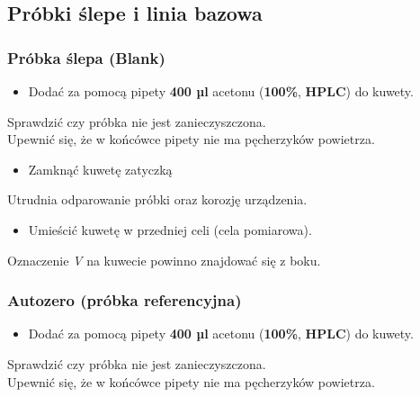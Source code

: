 \documentclass[
  letterpaper,
  DIV=11,
  numbers=noendperiod]{scrreprt}
\providecommand{\tightlist}{%
  \setlength{\itemsep}{0pt}\setlength{\parskip}{0pt}}\usepackage{longtable,booktabs,array}
\begin{document}
\hypertarget{pruxf3bki-ux15blepe-i-linia-bazowa}{%
\subsection{Próbki ślepe i linia
bazowa}\label{pruxf3bki-ux15blepe-i-linia-bazowa}}

\hypertarget{pruxf3bka-ux15blepa-blank}{%
\subsubsection{Próbka ślepa (Blank)}\label{pruxf3bka-ux15blepa-blank}}

\begin{itemize}
\tightlist
\item
  Dodać za pomocą pipety \textbf{400 µl} acetonu (\textbf{100\%},
  \textbf{HPLC}) do kuwety.
\end{itemize}

Sprawdzić czy próbka nie jest zanieczyszczona.\\
Upewnić się, że w końcówce pipety nie ma pęcherzyków powietrza.

\begin{itemize}
\tightlist
\item
  Zamknąć kuwetę zatyczką
\end{itemize}

Utrudnia odparowanie próbki oraz korozję urządzenia.

\begin{itemize}
\tightlist
\item
  Umieścić kuwetę w przedniej celi (cela pomiarowa).
\end{itemize}

Oznaczenie \emph{V} na kuwecie powinno znajdować się z boku.

\hypertarget{autozero-pruxf3bka-referencyjna}{%
\subsubsection{Autozero (próbka
referencyjna)}\label{autozero-pruxf3bka-referencyjna}}

\begin{itemize}
\tightlist
\item
  Dodać za pomocą pipety \textbf{400 µl} acetonu (\textbf{100\%},
  \textbf{HPLC}) do kuwety.
\end{itemize}

Sprawdzić czy próbka nie jest zanieczyszczona.\\
Upewnić się, że w końcówce pipety nie ma pęcherzyków powietrza.
\end{document}
